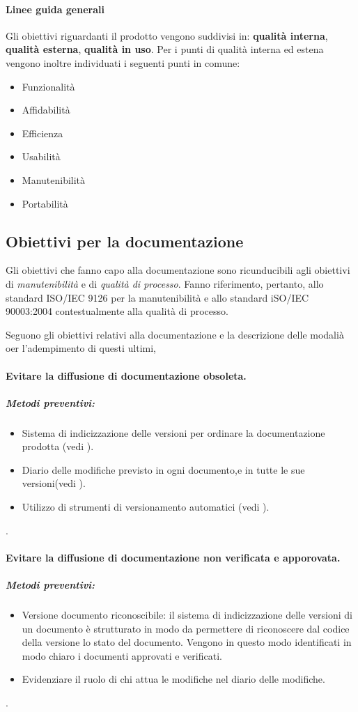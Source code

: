 \documentclass[12pt,a4paper]{article}
\begin{document}
\paragraph{Linee guida generali}
Gli obiettivi riguardanti il prodotto vengono suddivisi in: \textbf{qualità interna}, \textbf{qualità esterna}, \textbf{qualità in uso}.
Per i punti di qualità interna ed estena vengono inoltre individuati i seguenti punti in comune:
\begin{itemize}
	\item Funzionalità
	\item Affidabilità
	\item Efficienza
	\item Usabilità
	\item Manutenibilità
	\item Portabilità
\end{itemize}

\subsection{Obiettivi per la documentazione}
Gli obiettivi che fanno capo alla documentazione sono ricunducibili agli obiettivi di \textit{manutenibilità} e di \textit{qualità di processo}.
Fanno riferimento, pertanto, allo standard ISO/IEC 9126 per la manutenibilità e allo standard iSO/IEC 90003:2004 contestualmente alla qualità di processo.

Seguono gli obiettivi relativi alla documentazione e la descrizione  delle modalià oer l'adempimento di questi ultimi,

\paragraph {Evitare la diffusione di documentazione obsoleta.} 
\subparagraph{Metodi preventivi:}
\begin{itemize}
	\item Sistema di indicizzazione delle versioni  per ordinare la documentazione prodotta (vedi \NdP).
	\item Diario delle modifiche previsto in ogni documento,e in tutte le sue versioni(vedi \NdP).
	\item Utilizzo di strumenti di versionamento automatici (vedi \NdP).
\end{itemize}.

\paragraph{Evitare la diffusione di documentazione non verificata e apporovata.}
\subparagraph{Metodi preventivi:}
\begin{itemize}
	\item Versione documento riconoscibile: il sistema di indicizzazione delle versioni di un documento è strutturato in modo da permettere di riconoscere dal codice della versione lo stato del documento. Vengono in questo modo identificati in modo chiaro i documenti approvati e verificati.
	\item Evidenziare il ruolo di chi attua le modifiche nel diario delle modifiche.
\end{itemize}.
\end{document}
